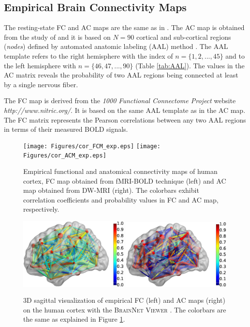 \documentclass[fleqn,10pt]{wlpeerj}
\begin{document}
\subsection*{Empirical Brain Connectivity Maps}

The resting-state FC and AC maps are the same as in  \cite{VUK14}. The AC map is obtained from the study of \cite{ITU08} and it is based on $N=90$ cortical and sub-cortical regions (\textit{nodes}) defined by automated anatomic labeling (AAL) method \citep{TZO02}. The AAL template refers to the right hemisphere with the index of $n=\{1,2,...,45\}$ and to the left hemisphere with $n=\{46,47,...,90\}$ (Table \ref{tab:AAL}). The values in the AC matrix reveals the probability of two AAL regions being connected at least by a single nervous fiber. 

The FC map is derived from the \textit{1000 Functional Connectome Project} website \textit{http://www.nitric.org/}.  It is based on the same AAL template as in the AC map. The FC matrix represents the Pearson correlations between any two AAL regions in terms of their measured BOLD signals.


\begin{figure}[ht]\centering
 \texttt{[image: Figures/cor\_FCM\_exp.eps]} 
 \texttt{[image: Figures/cor\_ACM\_exp.eps]} 

\caption{Empirical functional and anatomical connectivity maps of human cortex, FC map obtained from fMRI-BOLD technique (left) and AC map obtained from DW-MRI (right). The colorbars exhibit correlation coefficients and probability values in FC  and AC map, respectively. }
\label{fig:Empirical FCM and ACM}
\end{figure}


\begin{figure}[ht]\centering
	 \includegraphics[width=0.49\textwidth]{Figures/FCM_brain.eps} 
	 \includegraphics[width=0.49\textwidth]{Figures/ACM_brain.eps} 

\caption{3D sagittal visualization of empirical FC (left) and AC  maps (right) on the human cortex with the \textsc{BrainNet Viewer} \citep{XYZ13}. The colorbars are the same as explained in Figure \ref{fig:Empirical FCM and ACM}.  }
\label{fig:Empirical FCM and ACM in Cortex}
\end{figure}
\end{document}
